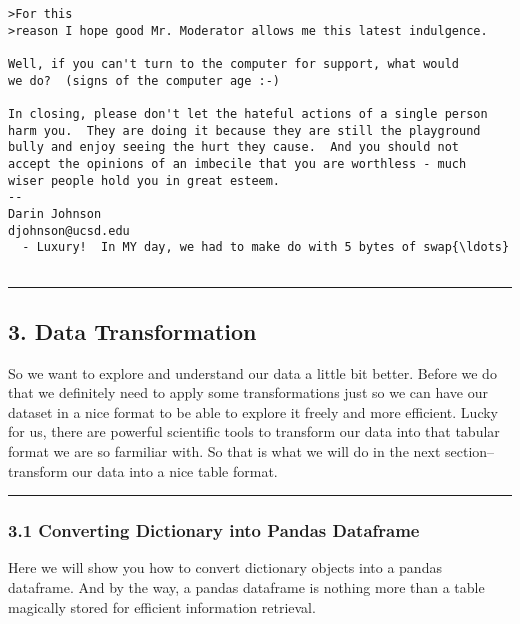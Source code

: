 \documentclass[11pt]{article}
\begin{document}
\begin{Verbatim}[commandchars=\\\{\}]
>For this
>reason I hope good Mr. Moderator allows me this latest indulgence.

Well, if you can't turn to the computer for support, what would
we do?  (signs of the computer age :-)

In closing, please don't let the hateful actions of a single person
harm you.  They are doing it because they are still the playground
bully and enjoy seeing the hurt they cause.  And you should not
accept the opinions of an imbecile that you are worthless - much
wiser people hold you in great esteem.
-- 
Darin Johnson
djohnson@ucsd.edu
  - Luxury!  In MY day, we had to make do with 5 bytes of swap{\ldots}


    \end{Verbatim}

    \begin{center}\rule{0.5\linewidth}{\linethickness}\end{center}

    \hypertarget{data-transformation}{%
\subsection{3. Data Transformation}\label{data-transformation}}

So we want to explore and understand our data a little bit better.
Before we do that we definitely need to apply some transformations just
so we can have our dataset in a nice format to be able to explore it
freely and more efficient. Lucky for us, there are powerful scientific
tools to transform our data into that tabular format we are so farmiliar
with. So that is what we will do in the next section--transform our data
into a nice table format.

    \begin{center}\rule{0.5\linewidth}{\linethickness}\end{center}

    \hypertarget{converting-dictionary-into-pandas-dataframe}{%
\subsubsection{3.1 Converting Dictionary into Pandas
Dataframe}\label{converting-dictionary-into-pandas-dataframe}}

Here we will show you how to convert dictionary objects into a pandas
dataframe. And by the way, a pandas dataframe is nothing more than a
table magically stored for efficient information retrieval.
\end{document}
